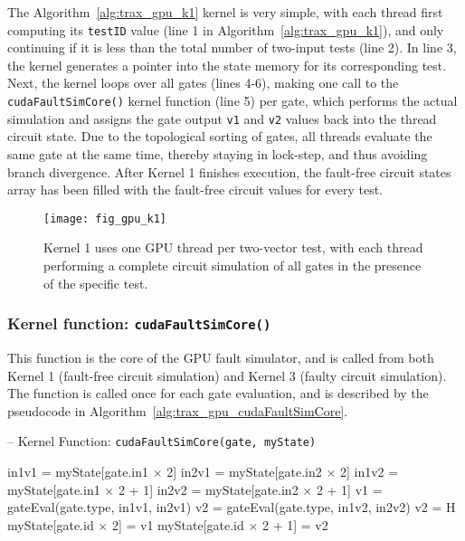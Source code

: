 The Algorithm~\ref{alg:trax_gpu_k1} kernel is very simple, with each thread first computing its \verb+testID+ value (line 1 in Algorithm~\ref{alg:trax_gpu_k1}), and only continuing if it is less than the total number of two-input tests (line 2).
%
In line 3, the kernel generates a pointer into the state memory for its corresponding test.
%
Next, the kernel loops over all gates (lines 4-6), making one call to the \verb+cudaFaultSimCore()+ kernel function (line 5) per gate, which performs the actual simulation and assigns the gate output \verb+v1+ and \verb+v2+ values back into the thread circuit state.
%
Due to the topological sorting of gates, all threads evaluate the same gate at the same time, thereby staying in lock-step, and thus avoiding branch divergence.
%
After Kernel 1 finishes execution, the fault-free circuit states array has been filled with the fault-free circuit values for every test.

\begin{figure}[hbtp]
\centering
\texttt{[image: fig\_gpu\_k1]}
\caption{Kernel 1 uses one GPU thread per two-vector test, with each thread performing a complete circuit simulation of all gates in the presence of the specific test.}
\label{fig:trax_gpu_k1}
\end{figure}

\subsubsection{Kernel function: {\tt cudaFaultSimCore()}}
\label{sec:trax_gpu_cuda_fault_sim_core}
This function is the core of the GPU fault simulator, and is called from both Kernel 1 (fault-free circuit simulation) and Kernel 3 (faulty circuit simulation).
%
The function is called once for each gate evaluation, and is described by the pseudocode in Algorithm~\ref{alg:trax_gpu_cudaFaultSimCore}.

\begin{algorithm}
\centering
\caption[GPU Kernel Function: \texttt{cudaFaultSimCore(gate, myState)}]{-- Kernel Function: \texttt{cudaFaultSimCore(gate, myState)}}
\label{alg:trax_gpu_cudaFaultSimCore}
\begin{algorithmic}[1]
\STATE in1v1 = myState[gate.in1 $\times$ 2]
\STATE in2v1 = myState[gate.in2 $\times$ 2]
\STATE in1v2 = myState[gate.in1 $\times$ 2 + 1]
\STATE in2v2 = myState[gate.in2 $\times$ 2 + 1]
\STATE v1 = gateEval(gate.type, in1v1, in2v1)
\STATE v2 = gateEval(gate.type, in1v2, in2v2)
  \STATE v2 = H
\ENDIF
\STATE myState[gate.id $\times$ 2] = v1
\STATE myState[gate.id $\times$ 2 + 1] = v2
\end{algorithmic}
\end{algorithm}

